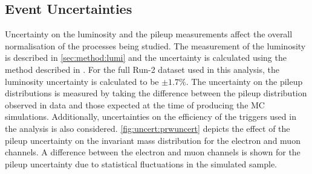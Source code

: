 \subsection{Event Uncertainties}
Uncertainty on the luminosity and the pileup measurements affect the overall normalisation of the processes being studied. The measurement of the luminosity is described in \cref{sec:method:lumi} and the uncertainty is calculated using the method described in \cite{Aaboud:2208146}. For the full Run-2 dataset used in this analysis, the luminosity uncertainty is calculated to be $\pm 1.7\%$. The uncertainty on the pileup distributions is measured by taking the difference between the pileup distribution observed in data and those expected at the time of producing the MC simulations. Additionally, uncertainties on the efficiency of the triggers used in the analysis is also considered.  \cref{fig:uncert:prwuncert} depicts the effect of the pileup uncertainty on the invariant mass distribution for the electron and muon channels. A difference between the electron and muon channels is shown for the pileup uncertainty due to statistical fluctuations in the simulated sample. 
